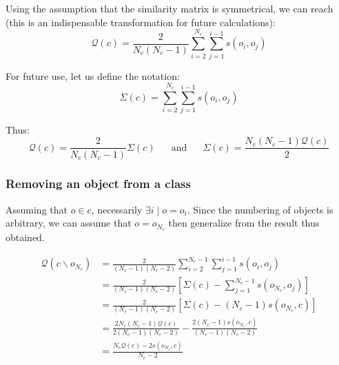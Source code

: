 \documentclass[a4paper,twoside]{article}
\begin{document}
Using the assumption that the similarity matrix is symmetrical, we can reach (this is an indispensable transformation for future calculations):
\begin{equation}
    \mathcal{Q}\left(c\right) = \frac{2}{N_c(N_c-1)} \sum_{i=2}^{N_c} \sum_{j=1}^{i-1} s\left(o_i, o_j\right)
    \label{eq:classQuality}
\end{equation}

For future use, let us define the notation:
\begin{equation}
  \Sigma(c) = \sum_{i=2}^{N_c} \sum_{j=1}^{i-1} s\left(o_i, o_j\right)
\end{equation}

Thus:
\begin{equation}
    \mathcal{Q}\left(c\right) = \frac{2}{N_c(N_c-1)}\Sigma(c) \phantom{XX}\mathrm{and}\phantom{XX} \Sigma(c) = \frac{N_c(N_c-1)\mathcal{Q}\left(c\right)}{2}
\end{equation}


\subsubsection{Removing an object from a class}

Assuming that $o \in c$, necessarily $\exists i \mid o=o_i$. Since the
numbering of objects is arbitrary, we can assume that $o = o_{N_c}$
then generalize from the result thus obtained.

\begin{equation}
  \begin{aligned}
    \mathcal{Q}\left(c \smallsetminus o_{N_c}\right) & = \frac{2}{(N_c-1)(N_c-2)} \sum_{i=2}^{N_c-1} \sum_{j=1}^{i-1} s\left(o_i, o_j\right) \\
                                                   & = \frac{2}{(N_c-1)(N_c-2)} \left[\Sigma(c) - \sum_{j=1}^{N_c-1} s\left(o_{N_c}, o_j\right) \right] \\
                                                   & = \frac{2}{(N_c-1)(N_c-2)} \left[\Sigma(c) - (N_c-1)s\left(o_{N_c}, c\right) \right] \\
                                                   & = \frac{2N_c(N_c-1)\mathcal{Q}(c)}{2(N_c-1)(N_c-2)} - \frac{2(N_c-1)s\left(o_{N_c}, c\right)}{(N_c-1)(N_c-2)}\\
                                                   & = \frac{N_c \mathcal{Q}(c)  - 2s\left(o_{N_c}, c\right)}{N_c-2}
  \end{aligned}
\end{equation}
\end{document}
